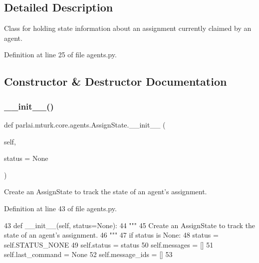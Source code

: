 \subsection{Detailed Description}
\begin{DoxyVerb}Class for holding state information about an assignment currently claimed by an
agent.
\end{DoxyVerb}
 

Definition at line 25 of file agents.\+py.



\subsection{Constructor \& Destructor Documentation}
\mbox{\label{classparlai_1_1mturk_1_1core_1_1agents_1_1AssignState_aace503a7d51d513573c41ac25cd6510f}} 
\subsubsection{\texorpdfstring{\+\_\+\+\_\+init\+\_\+\+\_\+()}{\_\_init\_\_()}}
{\footnotesize\ttfamily def parlai.\+mturk.\+core.\+agents.\+Assign\+State.\+\_\+\+\_\+init\+\_\+\+\_\+ (\begin{DoxyParamCaption}\item[{}]{self,  }\item[{}]{status = {\ttfamily None} }\end{DoxyParamCaption})}

\begin{DoxyVerb}Create an AssignState to track the state of an agent's assignment.
\end{DoxyVerb}
 

Definition at line 43 of file agents.\+py.


\begin{DoxyCode}
43     \textcolor{keyword}{def }\_\_init\_\_(self, status=None):
44         \textcolor{stringliteral}{"""}
45 \textcolor{stringliteral}{        Create an AssignState to track the state of an agent's assignment.}
46 \textcolor{stringliteral}{        """}
47         \textcolor{keywordflow}{if} status \textcolor{keywordflow}{is} \textcolor{keywordtype}{None}:
48             status = self.STATUS\_NONE
49         self.status = status
50         self.messages = []
51         self.last\_command = \textcolor{keywordtype}{None}
52         self.message\_ids = []
53 
\end{DoxyCode}


